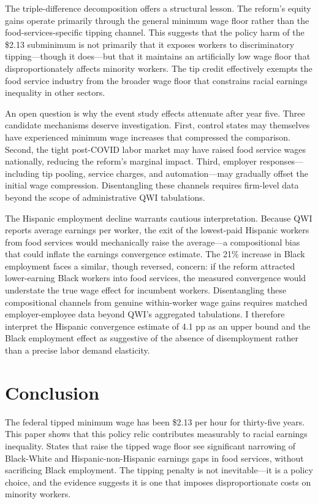 \documentclass[12pt]{article}
\begin{document}
The triple-difference decomposition offers a structural lesson. The reform's equity gains operate primarily through the general minimum wage floor rather than the food-services-specific tipping channel. This suggests that the policy harm of the \$2.13 subminimum is not primarily that it exposes workers to discriminatory tipping---though it does---but that it maintains an artificially low wage floor that disproportionately affects minority workers. The tip credit effectively exempts the food service industry from the broader wage floor that constrains racial earnings inequality in other sectors.

An open question is why the event study effects attenuate after year five. Three candidate mechanisms deserve investigation. First, control states may themselves have experienced minimum wage increases that compressed the comparison. Second, the tight post-COVID labor market may have raised food service wages nationally, reducing the reform's marginal impact. Third, employer responses---including tip pooling, service charges, and automation---may gradually offset the initial wage compression. Disentangling these channels requires firm-level data beyond the scope of administrative QWI tabulations.

The Hispanic employment decline warrants cautious interpretation. Because QWI reports average earnings per worker, the exit of the lowest-paid Hispanic workers from food services would mechanically raise the average---a compositional bias that could inflate the earnings convergence estimate. The 21\% increase in Black employment faces a similar, though reversed, concern: if the reform attracted lower-earning Black workers into food services, the measured convergence would understate the true wage effect for incumbent workers. Disentangling these compositional channels from genuine within-worker wage gains requires matched employer-employee data beyond QWI's aggregated tabulations. I therefore interpret the Hispanic convergence estimate of 4.1 pp as an upper bound and the Black employment effect as suggestive of the absence of disemployment rather than a precise labor demand elasticity.

\section{Conclusion}

The federal tipped minimum wage has been \$2.13 per hour for thirty-five years. This paper shows that this policy relic contributes measurably to racial earnings inequality. States that raise the tipped wage floor see significant narrowing of Black-White and Hispanic-non-Hispanic earnings gaps in food services, without sacrificing Black employment. The tipping penalty is not inevitable---it is a policy choice, and the evidence suggests it is one that imposes disproportionate costs on minority workers.
\end{document}
